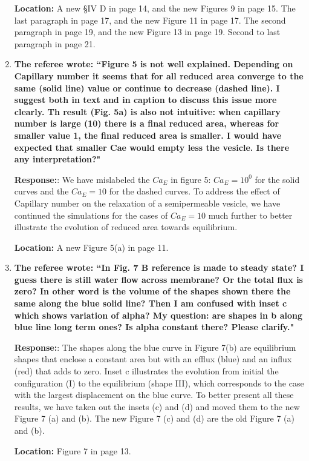 \documentclass[11pt]{article}
\begin{document}
\begin{enumerate}
\noindent
{\bf Location:} A new \S IV D in page 14, and the new Figures 9 in page 15. The last paragraph in page 17, and the new Figure 11 in page 17. The second paragraph in page 19, and the new Figure 13 in page 19. Second to last paragraph in page 21.


\item {\bf 
The referee wrote:
``Figure 5 is not well explained. Depending on Capillary number it
seems that for all reduced area converge to the same (solid line)
value or continue to decrease (dashed line). I suggest both in text
and in caption to discuss this issue more clearly. Th result (Fig. 5a)
is also not intuitive: when capillary number is large (10) there is a
final reduced area, whereas for smaller value 1, the final reduced
area is smaller. I would have expected that smaller Cae would empty
less the vesicle. Is there any interpretation?"}

\noindent
{\bf Response:}: We have mislabeled the $Ca_E$ in figure 5:  $Ca_E=10^0$ for the solid curves and the $Ca_E=10$ for the dashed curves. To address the effect of Capillary number on the relaxation of a semipermeable vesicle, we have continued the simulations for the cases of $Ca_E = 10$ much further to better illustrate the evolution of reduced area towards equilibrium.

\noindent
{\bf Location:} A new Figure 5(a) in page 11.

\item{\bf
The referee wrote:
``In Fig. 7 B reference is made to steady state? I guess there is
still water flow across membrane? Or the total flux is zero? In other
word is the volume of the shapes shown there the same along the blue
solid line? Then I am confused with inset c which shows variation of
alpha? My question: are shapes in b along blue line long term ones? Is
alpha constant there? Please clarify."}

\noindent
{\bf Response:}: The shapes along the blue curve in Figure 7(b) are equilibrium shapes that enclose a constant area but with an efflux (blue) and an influx (red) that adds to zero. Inset c illustrates the evolution from initial  the configuration (I) to the equilibrium (shape III), which corresponds to the case with the largest displacement on the blue curve. To better present all these results, we have taken out the insets (c) and (d) and moved them to the new Figure 7 (a) and (b). The new Figure 7 (c) and (d) are the old Figure  7 (a) and (b).

\noindent
{\bf Location:} Figure 7 in page 13.


\end{enumerate}
\end{document}
